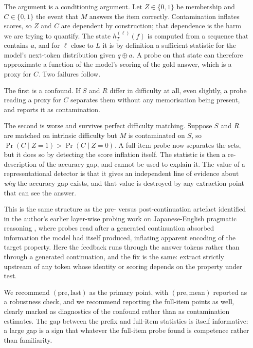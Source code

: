\documentclass[10pt,twocolumn,letterpaper]{article}
\begin{document}
The argument is a conditioning argument. Let $Z\in\{0,1\}$ be membership and $C\in\{0,1\}$ the event that $M$ answers the item correctly. Contamination inflates scores, so $Z$ and $C$ are dependent by construction; that dependence is the harm we are trying to quantify. The state $h^{(\ell)}_{T}(f)$ is computed from a sequence that contains $a$, and for $\ell$ close to $L$ it is by definition a sufficient statistic for the model's next-token distribution given $q\oplus a$. A probe on that state can therefore approximate a function of the model's scoring of the gold answer, which is a proxy for $C$. Two failures follow.

The first is a confound. If $S$ and $R$ differ in difficulty at all, even slightly, a probe reading a proxy for $C$ separates them without any memorisation being present, and reports it as contamination.

The second is worse and survives perfect difficulty matching. Suppose $S$ and $R$ are matched on intrinsic difficulty but $M$ is contaminated on $S$, so $\Pr(C\mid Z{=}1)>\Pr(C\mid Z{=}0)$. A full-item probe now separates the sets, but it does so by detecting the score inflation itself. The statistic is then a re-description of the accuracy gap, and cannot be used to explain it. The value of a representational detector is that it gives an independent line of evidence about \emph{why} the accuracy gap exists, and that value is destroyed by any extraction point that can see the answer.

This is the same structure as the pre- versus post-continuation artefact identified in the author's earlier layer-wise probing work on Japanese-English pragmatic reasoning \cite{braun2026crosslingual}, where probes read after a generated continuation absorbed information the model had itself produced, inflating apparent encoding of the target property. Here the feedback runs through the answer tokens rather than through a generated continuation, and the fix is the same: extract strictly upstream of any token whose identity or scoring depends on the property under test.

We recommend $(\mathrm{pre},\mathrm{last})$ as the primary point, with $(\mathrm{pre},\mathrm{mean})$ reported as a robustness check, and we recommend reporting the full-item points as well, clearly marked as diagnostics of the confound rather than as contamination estimates. The gap between the prefix and full-item statistics is itself informative: a large gap is a sign that whatever the full-item probe found is competence rather than familiarity.
\end{document}
